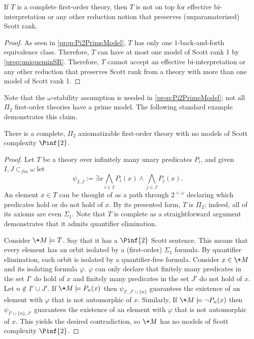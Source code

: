\documentclass{amsart}
\renewcommand{\-}{\text{-}}
\begin{document}
\begin{corollary}
If $T$ is a complete first-order theory, then $T$ is not on top for effective bi-interpretation or any other reduction notion that preserves (unparamaterized) Scott rank.
\end{corollary}

\begin{proof}
As seen in \cref{prop:Pi2PrimeModel}, $T$ has only one $1$-back-and-forth equivalence class.
Therefore, $T$ can have at most one model of Scott rank 1 by \cref{prop:uniqueminSR}.
Therefore, $T$ cannot accept an effective bi-interpretation or any other reduction that preserves Scott rank from a theory with more than one model of Scott rank 1.
\end{proof}


Note that the $\omega$-stability assumption is needed in \cref{prop:Pi2PrimeModel}; not all $\Pi_2$ first-order theories have a prime model.
The following standard example demonstrates this claim.

\begin{proposition}
There is a complete, $\Pi_2$ axiomatizable first-order theory with no models of Scott complexity $\Pinf{2}$.
\end{proposition}

\begin{proof}
  Let $T$ be a theory over infinitely many unary predicates $P_i$,  and given $I,J\subset_{fin}\omega$ let
\[ \psi_{I,J} := \exists x \bigwedge_{i\in I} P_i(x) \land \bigwedge_{j\in J} P_j(x).\]
An element $x\in T$ can be thought of as a path through $2^{<\omega}$ declaring which predicates hold or do not hold of $x$.
By its presented form, $T$ is $\Pi_2$; indeed, all of its axioms are even $\Sigma_1$.
Note that $T$ is complete as a straightforward argument demonstrates that it admits quantifier elimination.

Consider $\+M\models T$.
Say that it has a $\Pinf{2}$ Scott sentence.
This means that every element has an orbit isolated by a (first-order) $\Sigma_1$ formula.
By quantifier elimination, each orbit is isolated by a quantifier-free formula.
Consider $x\in \+M$ and its isolating formula $\varphi$.
$\varphi$ can only declare that finitely many predicates in the set $I'$ do hold of $x$ and finitely many predicates in the set $J'$ do not hold of $x$.
Let $n\notin I'\cup J'$.
If $\+M\models P_n(x)$ then $\psi_{I',J'\cup\{n\}}$ guarantees the existence of an element with $\varphi$ that is not automorphic of $x$.
Similarly, If $\+M\models \lnot P_n(x)$ then $\psi_{I'\cup\{n\},J'}$ guarantees the existence of an element with $\varphi$ that is not automorphic of $x$.
This yields the desired contradiction, so $\+M$ has no models of Scott complexity $\Pinf{2}$.
\end{proof}
\end{document}
